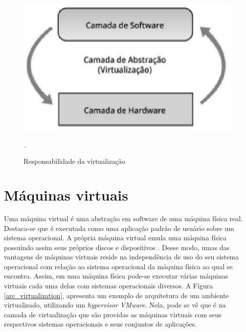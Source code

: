 \begin{figure}[!htb]
\centering
\includegraphics [keepaspectratio=true,scale=0.8]{figuras/virtualization_role.eps}
\caption{Responsabilidade da virtualização}
\cite{manoel}.
\label{virtualization_role}
\end{figure}

\section{Máquinas virtuais}
Uma máquina virtual é uma abstração em software de uma máquina física real. Destaca-se que é executada como uma aplicação padrão de usuário sobre um sistema operacional. A própria máquina virtual emula uma máquina física possuindo assim seus próprios discos e dispositivos \cite{mcewan}. Desse modo, umas das vantagens de máquinas virtuais reside na independência de uso do seu sistema operacional com relação ao sistema operacional da máquina física ao qual se encontra. Assim, em uma máquina física pode-se executar várias máquinas virtuais cada uma delas com sistemas operacionais diversos. A Figura \ref{arc_virtualization}, apresenta um exemplo de arquitetura de um ambiente virtualizado, utilizando um \textit{hypervisor} \textit{VMware}. Nela, pode se vê que é na camada de virtualização que são providas as máquinas virtuais com seus respectivos sistemas operacionais e seus conjuntos de aplicações.%

